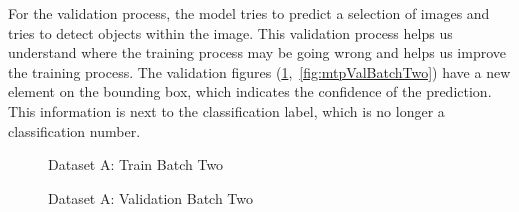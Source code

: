 \documentclass[12pt]{report} %
\begin{document}
			For the validation process, the model tries to predict a selection of images and tries to detect objects within the image. This validation process helps us understand where the training process may be going wrong and helps us improve the training process. The validation figures (\ref{fig:ukValBatchTwo},~\ref{fig:mtpValBatchTwo}) have a new element on the bounding box, which indicates the confidence of the prediction. This information is next to the classification label, which is no longer a classification number. 
			\begin{figure}[ht]
				\begin{floatrow}
					{
						\caption{Dataset A: Train Batch Two}
						\label{fig:ukTrainBatchTwo}
					}
				
					{
						\caption{Dataset A: Validation Batch Two}
						\label{fig:ukValBatchTwo}
					}
				\end{floatrow}
			\end{figure}
\end{document}
